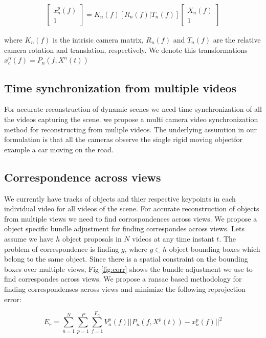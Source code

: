\documentclass[10pt,twocolumn,letterpaper]{article}
\begin{document}
\begin{align*}
 \begin{bmatrix} x_n^p(f) \\ 1  \end{bmatrix} = K_n(f)[R_n(f) | T_n(f)] \begin{bmatrix} X_n(f) \\ 1  \end{bmatrix}
\end{align*} 

where $K_n(f)$ is the intrisic camera matrix, $R_n(f)$ and $T_n(f)$ are the relative camera rotation and translation, respectively. We denote this transformations $x_c^n(f) = P_n(f,X^n(t))$

\subsection{Time synchronization from multiple videos}
For accurate reconstruction of dynamic scenes we need time synchronization of all the videos capturing the scene. we propose a multi camera video synchronization method for reconstructing from muliple videos. The underlying assumtion in our formulation is that all the cameras observe the single rigid moving objectfor example a car moving on the road. 

\subsection{Correspondence across views}
We currently have tracks of objects and thier respective keypoints in each individual video for all videos of the scene. For accurate reconstruction of objects from multiple views we need to find corrospondences across views. We propose a object specific bundle adjustment for finding correspondes across views. Lets assume we have $h$ object proposals in $N$ videos at any time instant $t$. The problem of correspondence is finding $g$, where $g \subset h$ object bounding boxes which belong to the same object. Since there is a spatial constraint on the bounding boxes over multiple views, Fig \ref{fig:corr} shows the bundle adjustment we use to find correspondes across views. We propose a ransac based methodology for finding correspondenses across views and minimize the following reprojection error:

\begin{equation}
  	E_r =\sum_{n=1}^{N} \sum_{p=1}^P \sum_{f=1}^{F_n} V_n^p(f) ||P_n(f,X^p(t)) - x_n^p(f)||^2
\end{equation}
   
\end{document}
